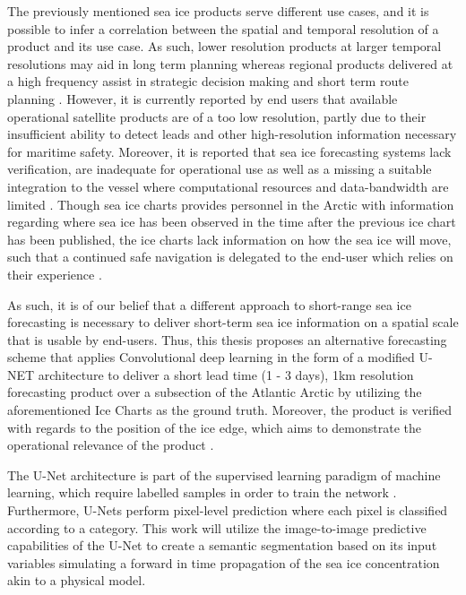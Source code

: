 \documentclass[../main/thesis.tex]{subfiles}
\begin{document}
The previously mentioned sea ice products serve different use cases, and it is possible to infer a correlation between the spatial and temporal resolution of a product and its use case. As such, lower resolution products at larger temporal resolutions may aid in long term planning whereas regional products delivered at a high frequency assist in strategic decision making and short term route planning \cite{Wagner2020}. However, it is currently reported by end users that available operational satellite products are of a too low resolution, partly due to their insufficient ability to detect leads and other high-resolution information necessary for maritime safety. Moreover, it is reported that sea ice forecasting systems lack verification, are inadequate for operational use as well as a missing a suitable integration to the vessel where computational resources and data-bandwidth are limited \cite{Veland2021}. Though sea ice charts provides personnel in the Arctic with information regarding where sea ice has been observed in the time after the previous ice chart has been published, the ice charts lack information on how the sea ice will move, such that a continued safe navigation is delegated to the end-user which relies on their experience \cite{Veland2021}.

As such, it is of our belief that a different approach to short-range sea ice forecasting is necessary to deliver short-term sea ice information on a spatial scale that is usable by end-users. Thus, this thesis proposes an alternative forecasting scheme that applies Convolutional deep learning in the form of a modified U-NET architecture \cite{Ronneberger2015} to deliver a short lead time (1 - 3 days), 1km resolution forecasting product over a subsection of the Atlantic Arctic by utilizing the aforementioned Ice Charts as the ground truth. Moreover, the product is verified with regards to the position of the ice edge, which aims to demonstrate the operational relevance of the product \cite{Veland2021, Melsom2019}.

The U-Net architecture is part of the supervised learning paradigm of machine learning, which require labelled samples in order to train the network \cite{Ronneberger2015}. Furthermore, U-Nets perform pixel-level prediction where each pixel is classified according to a category. This work will utilize the image-to-image predictive capabilities of the U-Net to create a semantic segmentation based on its input variables simulating a forward in time propagation of the sea ice concentration akin to a physical model.
\end{document}
